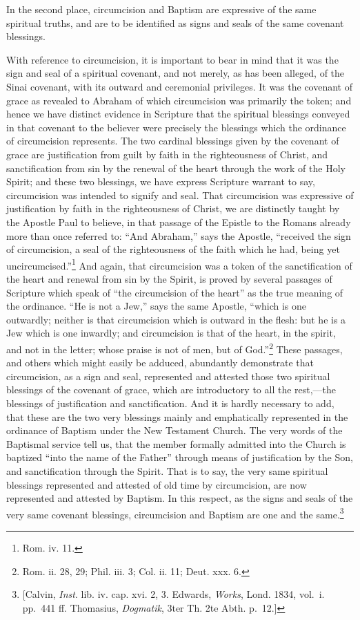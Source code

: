 \documentclass[]{book}
\begin{document}
In the second place, circumcision and Baptism are expressive of the same spiritual truths, and are to be identified as signs and seals of the same covenant blessings.

With reference to circumcision, it is important to bear in mind that it was the sign and seal of a spiritual covenant, and not merely, as has been alleged, of the Sinai covenant, with its outward and ceremonial privileges. It was the covenant of grace as revealed to Abraham of which circumcision was primarily the token; and hence we have distinct evidence in Scripture that the spiritual blessings conveyed in that covenant to the believer were precisely the blessings which the ordinance of circumcision represents. The two cardinal blessings given by the covenant of grace are justification from guilt by faith in the righteousness of Christ, and sanctification from sin by the renewal of the heart through the work of the Holy Spirit; and these two blessings, we have express Scripture warrant to say, circumcision was intended to signify and seal. That circumcision was expressive of justification by faith in the righteousness of Christ, we are distinctly taught by the Apostle Paul to believe, in that passage of the Epistle to the Romans already more than once referred to: ``And Abraham,'' says the Apostle, ``received the sign of circumcision, a seal of the righteousness of the faith which he had, being yet uncircumcised.''\footnote{Rom. iv. 11.} And again, that circumcision was a token of the sanctification of the heart and renewal from sin by the Spirit, is proved by several passages of Scripture which speak of ``the circumcision of the heart'' as the true meaning of the ordinance. ``He is not a Jew,'' says the same Apostle, ``which is one outwardly; neither is that circumcision which is outward in the flesh: but he is a Jew which is one inwardly; and circumcision is that of the heart, in the spirit, and not in the letter; whose praise is not of men, but of God.''\footnote{Rom. ii. 28, 29; Phil. iii. 3; Col. ii. 11; Deut. xxx. 6.} These passages, and others which might easily be adduced, abundantly demonstrate that circumcision, as a sign and seal, represented and attested those two spiritual blessings of the covenant of grace, which are introductory to all the rest,---the blessings of justification and sanctification. And it is hardly necessary to add, that these are the two very blessings mainly and emphatically represented in the ordinance of Baptism under the New Testament Church. The very words of the Baptismal service tell us, that the member formally admitted into the Church is baptized ``into the name of the Father'' through means of justification by the Son, and sanctification through the Spirit. That is to say, the very same spiritual blessings represented and attested of old time by circumcision, are now represented and attested by Baptism. In this respect, as the signs and seals of the very same covenant blessings, circumcision and Baptism are one and the same.\footnote{{[}Calvin, \emph{Inst}. lib. iv. cap. xvi. 2, 3. Edwards, \emph{Works}, Lond. 1834, vol.~i. pp.~441 ff. Thomasius, \emph{Dogmatik}, 3ter Th. 2te Abth. p.~12.{]}}
\end{document}
